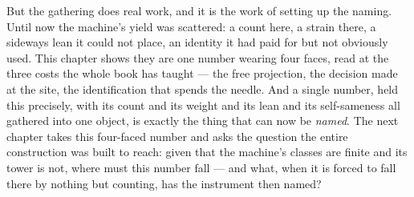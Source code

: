 But the gathering does real work, and it is the work of setting up the naming. Until now the machine's yield was
scattered: a count here, a strain there, a sideways lean it could not place, an identity it had paid for but not
obviously used. This chapter shows they are one number wearing four faces, read at the three costs the whole book
has taught --- the free projection, the decision made at the site, the identification that spends the needle. And
a single number, held this precisely, with its count and its weight and its lean and its self-sameness all
gathered into one object, is exactly the thing that can now be \emph{named}. The next chapter takes this
four-faced number and asks the question the entire construction was built to reach: given that the machine's
classes are finite and its tower is not, where must this number fall --- and what, when it is forced to fall
there by nothing but counting, has the instrument then named?
